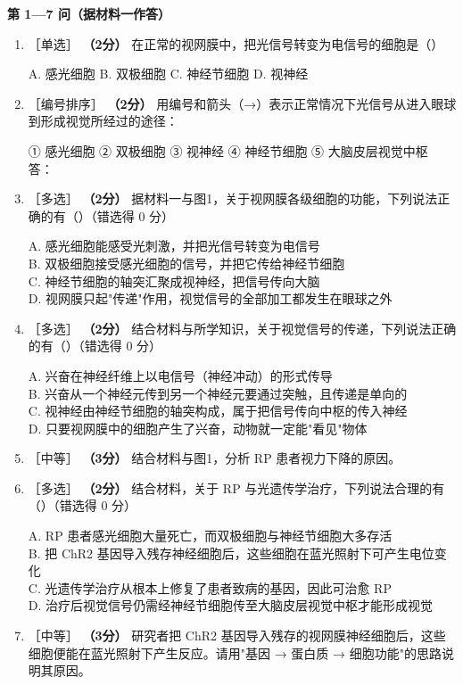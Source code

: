 \documentclass[UTF8,a4paper,11pt]{ctexart}
\newcommand{\pt}[1]{\textbf{（#1分）}}
\newcommand{\lv}[1]{{\small\color{deepgreen}［#1］}}
\newcommand{\tian}[1]{\underline{\hspace{#1}}}
\newcommand{\choice}[1]{\par\smallskip\noindent #1\par}
\begin{document}
\begin{qbox}
\noindent\textbf{\color{deepgreen}第 1—7 问（据材料一作答）}
\begin{enumerate}[leftmargin=2.2em,itemsep=5pt]
\item \lv{单选} \pt{2} 在正常的视网膜中，把光信号转变为电信号的细胞是（\quad）\\
\choice{A. 感光细胞 \quad B. 双极细胞 \quad C. 神经节细胞 \quad D. 视神经}

\item \lv{编号排序} \pt{2} 用编号和箭头（→）表示正常情况下光信号从进入眼球到形成视觉所经过的途径：\\
\choice{① 感光细胞 \quad ② 双极细胞 \quad ③ 视神经 \quad ④ 神经节细胞 \quad ⑤ 大脑皮层视觉中枢\\
答：\tian{7.4cm}}

\item \lv{多选} \pt{2} 据材料一与图1，关于视网膜各级细胞的功能，下列说法正确的有（\quad）（错选得 0 分）\\
\choice{A. 感光细胞能感受光刺激，并把光信号转变为电信号\\
B. 双极细胞接受感光细胞的信号，并把它传给神经节细胞\\
C. 神经节细胞的轴突汇聚成视神经，把信号传向大脑\\
D. 视网膜只起"传递"作用，视觉信号的全部加工都发生在眼球之外}

\item \lv{多选} \pt{2} 结合材料与所学知识，关于视觉信号的传递，下列说法正确的有（\quad）（错选得 0 分）\\
\choice{A. 兴奋在神经纤维上以电信号（神经冲动）的形式传导\\
B. 兴奋从一个神经元传到另一个神经元要通过突触，且传递是单向的\\
C. 视神经由神经节细胞的轴突构成，属于把信号传向中枢的传入神经\\
D. 只要视网膜中的细胞产生了兴奋，动物就一定能"看见"物体}

\item \lv{中等} \pt{3} 结合材料与图1，分析 RP 患者视力下降的原因。\tian{0.48\textwidth}

\item \lv{多选} \pt{2} 结合材料，关于 RP 与光遗传学治疗，下列说法合理的有（\quad）（错选得 0 分）\\
\choice{A. RP 患者感光细胞大量死亡，而双极细胞与神经节细胞大多存活\\
B. 把 ChR2 基因导入残存神经细胞后，这些细胞在蓝光照射下可产生电位变化\\
C. 光遗传学治疗从根本上修复了患者致病的基因，因此可治愈 RP\\
D. 治疗后视觉信号仍需经神经节细胞传至大脑皮层视觉中枢才能形成视觉}

\item \lv{中等} \pt{3} 研究者把 ChR2 基因导入残存的视网膜神经细胞后，这些细胞便能在蓝光照射下产生反应。请用"基因 → 蛋白质 → 细胞功能"的思路说明其原因。
\end{enumerate}
\end{qbox}
\end{document}
